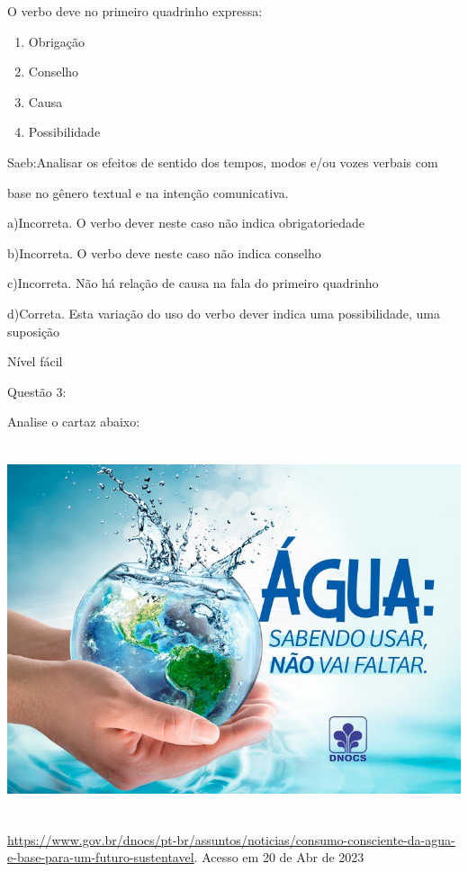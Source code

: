 O verbo deve no primeiro quadrinho expressa:

\begin{enumerate}
\def\labelenumi{\alph{enumi})}
\item
  Obrigação
\item
  Conselho
\item
  Causa
\item
  Possibilidade
\end{enumerate}

Saeb:Analisar os efeitos de sentido dos tempos, modos e/ou vozes verbais
com

base no gênero textual e na intenção comunicativa.

a)Incorreta. O verbo dever neste caso não indica obrigatoriedade

b)Incorreta. O verbo deve neste caso não indica conselho

c)Incorreta. Não há relação de causa na fala do primeiro quadrinho

d)Correta. Esta variação do uso do verbo dever indica uma possibilidade,
uma suposição

Nível fácil

Questão 3:

Analise o cartaz abaixo:

\includegraphics[width=5.90551in,height=4.29167in]{./imgSAEB_7_POR/media/image13.png}

\href{https://www.gov.br/dnocs/pt-br/assuntos/noticias/consumo-consciente-da-agua-e-base-para-um-futuro-sustentavel}{\uline{https://www.gov.br/dnocs/pt-br/assuntos/noticias/consumo-consciente-da-agua-e-base-para-um-futuro-sustentavel}}.
Acesso em 20 de Abr de 2023

